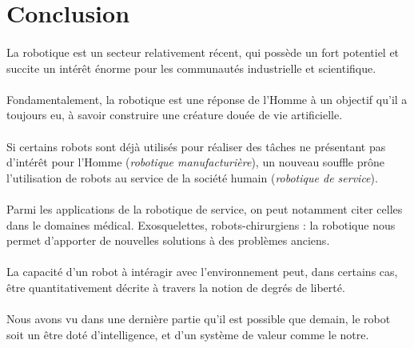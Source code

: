 \documentclass[a4paper,10pt]{article}
\begin{document}
            
    \newpage
    \section*{Conclusion}
        \paragraph{}
            La robotique est un secteur relativement récent, qui 
            possède un fort potentiel et succite un intérêt énorme pour 
            les communautés industrielle et scientifique. 
    
        \paragraph{}
            Fondamentalement, la robotique est une réponse de l'Homme à un objectif qu'il 
            a toujours eu, à savoir construire une créature douée de vie artificielle. 
            
        \paragraph{}
            Si certains robots sont déjà utilisés pour réaliser 
            des tâches ne présentant pas d'intérêt pour l'Homme 
            (\textit{robotique manufacturière}), un nouveau souffle 
            prône l'utilisation de robots au service de la société humain 
            (\textit{robotique de service}). 
            
        \paragraph{}
            Parmi les applications de la robotique de service, 
            on peut notamment citer celles dans le domaines médical.
            Exosquelettes, robots-chirurgiens : la robotique nous permet 
            d'apporter de nouvelles solutions à des problèmes anciens. 
            
        \paragraph{}
            La capacité d'un robot à intéragir avec l'environnement
            peut, dans certains cas, être quantitativement décrite à 
            travers la notion de degrés de liberté. 
            
        \paragraph{}
            Nous avons vu dans une dernière partie qu'il est possible 
            que demain, le robot soit un être doté d'intelligence, 
            et d'un système de valeur comme le notre. 
            
\end{document}
